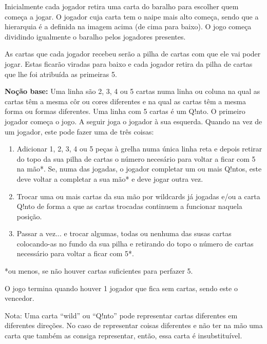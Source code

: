 \documentclass[a4paper]{article}
\begin{document}
	Inicialmente cada jogador retira uma carta do baralho para escolher quem começa a jogar. O jogador cuja carta tem o naipe mais alto começa, sendo que a hierarquia é a definida na imagem acima (de cima para baixo). O jogo começa dividindo igualmente o baralho pelos jogadores presentes.
	
	As cartas que cada jogador recebeu serão a pilha de cartas com que ele vai poder jogar. Estas ficarão viradas para baixo e cada jogador retira da pilha de cartas que lhe foi atribuída as primeiras 5. 
	
	\textbf{Noção base:} Uma linha são 2, 3, 4 ou 5 cartas numa linha ou coluna na qual as cartas têm a mesma côr ou cores diferentes e na qual as cartas têm a mesma forma ou formas diferentes. Uma linha com 5 cartas é um Q!nto.
	O primeiro jogador começa o jogo. A seguir joga o jogador à sua esquerda. Quando na vez de um jogador, este pode fazer uma de três coisas:
	
	\begin{enumerate}
	\item 		Adicionar 1, 2, 3, 4 ou 5 peças à grelha numa única linha reta e depois retirar do topo da sua pilha de cartas o número necesário para voltar a ficar com 5 na mão*.
	Se, numa das jogadas, o jogador completar um ou mais Q!ntos, este deve voltar a completar a sua mão* e deve jogar outra vez.
	\item		Trocar uma ou mais cartas da sua mão por wildcards já jogadas e/ou a carta Q!nto de forma a que as cartas trocadas continuem a funcionar naquela posição.
	\item		Passar a vez... e trocar algumas, todas ou nenhuma das susas cartas colocando-as no fundo da sua pilha e retirando do topo o número de cartas necessário para voltar a ficar com 5*.
	\end{enumerate}
	
	\small
	*ou menos, se não houver cartas suficientes para perfazer 5.
	\normalsize
	
	\bigskip
	
	O jogo termina quando houver 1 jogador que fica sem cartas, sendo este o vencedor.\newline
	
	\small
	\noindent
	Nota: Uma carta “wild” ou “Q!nto” pode representar cartas diferentes em diferentes direções. No caso de representar coisas diferentes e não ter na mão uma carta que também as consiga representar, então, essa carta é insubstituível.
	\normalsize
	
	
	
	
\end{document}
